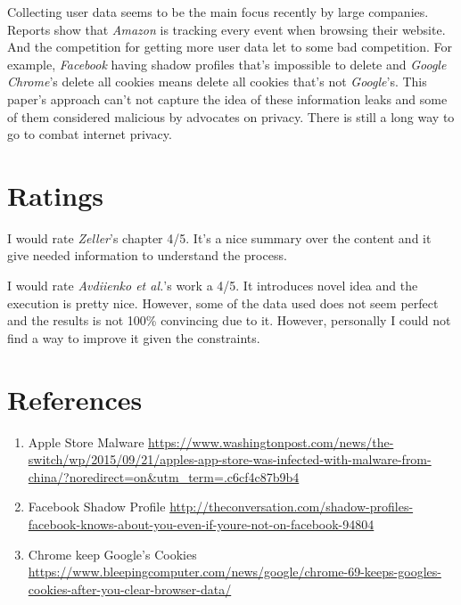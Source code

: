 \documentclass[sigconf]{acmart}
\begin{document}
Collecting user data seems to be the main focus recently by large companies. Reports show that {\it Amazon} is tracking every event when browsing their website. And the competition for getting more user data let to some bad competition. For example, {\it Facebook} having shadow profiles that's impossible to delete and {\it Google Chrome}'s delete all cookies means delete all cookies that's not {\it Google}'s. This paper's approach can't not capture the idea of these information leaks and some of them considered malicious by advocates on privacy. There is still a long way to go to combat internet privacy.


\section{Ratings}
I would rate {\it Zeller}'s chapter 4/5. It's a nice summary over the content and it give needed information to understand the process.

I would rate {\it Avdiienko et al.}'s work a 4/5. It introduces novel idea and the execution is pretty nice. However, some of the data used does not seem perfect and the results is not 100\% convincing due to it. However, personally I could not find a way to improve it given the constraints.

\section{References}
\begin{enumerate}
    \item Apple Store Malware \url{https://www.washingtonpost.com/news/the-switch/wp/2015/09/21/apples-app-store-was-infected-with-malware-from-china/?noredirect=on&utm_term=.c6cf4c87b9b4}
    \item Facebook Shadow Profile \url{http://theconversation.com/shadow-profiles-facebook-knows-about-you-even-if-youre-not-on-facebook-94804}
    \item Chrome keep Google's Cookies \url{https://www.bleepingcomputer.com/news/google/chrome-69-keeps-googles-cookies-after-you-clear-browser-data/}
\end{enumerate}
\end{document}
